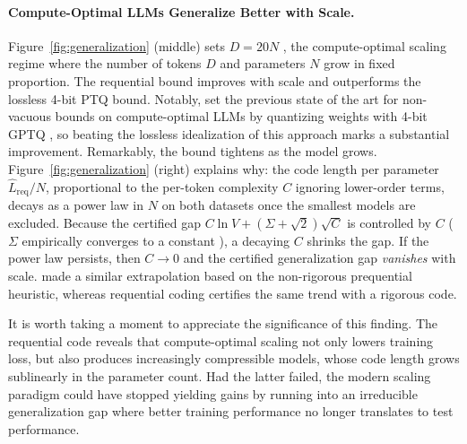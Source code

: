 \documentclass{article}
\theoremstyle{plain}
\theoremstyle{definition}
\theoremstyle{remark}
\begin{document}
\paragraph{Compute-Optimal LLMs Generalize Better with Scale.} Figure~\ref{fig:generalization} (middle) sets $D=20N$ \citep{hoffmann2022training}, the compute-optimal scaling regime where the number of tokens $D$ and parameters $N$ grow in fixed proportion. The requential bound improves with scale and outperforms the lossless 4-bit PTQ bound. Notably, \citet{finzi2025compute} set the previous state of the art for non-vacuous bounds on compute-optimal LLMs by quantizing weights with 4-bit GPTQ \citep{frantar2023gptq}, so beating the lossless idealization of this approach marks a substantial improvement. Remarkably, the bound tightens as the model grows. Figure~\ref{fig:generalization} (right) explains why: the code length per parameter $\widehat{L}_{\mathrm{req}}/N$, proportional to the per-token complexity $C$ ignoring lower-order terms, decays as a power law in $N$ on both datasets once the smallest models are excluded. Because the certified gap $C\ln V + (\Sigma + \sqrt{2})\sqrt{C}$ is controlled by $C$ ($\Sigma$ empirically converges to a constant \citep{finzi2025compute}), a decaying $C$ shrinks the gap. If the power law persists, then $C \to 0$ and the certified generalization gap \emph{vanishes} with scale. \citet{finzi2025compute} made a similar extrapolation based on the non-rigorous prequential heuristic, whereas requential coding certifies the same trend with a rigorous code.

It is worth taking a moment to appreciate the significance of this finding. The requential code reveals that compute-optimal scaling not only lowers training loss, but also produces increasingly compressible models, whose code length grows sublinearly in the parameter count. Had the latter failed, the modern scaling paradigm could have stopped yielding gains by running into an irreducible generalization gap where better training performance no longer translates to test performance. 
\clearpage
%

%
%
%
%
%
%
%
%

%


%


%



%
%


%


%

%
%
%
\end{document}
